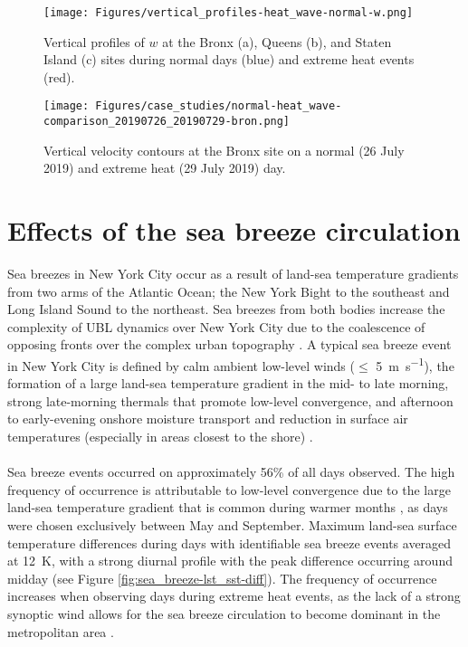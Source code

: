 \begin{figure}[ht]
	\centering
	\texttt{[image: Figures/vertical\_profiles-heat\_wave-normal-w.png]}
	\caption{Vertical profiles of $w$ at the Bronx (a), Queens (b), and Staten Island (c) sites during normal days (blue) and extreme heat events (red).}
	\label{fig:extreme-heat-normal-vertical_profiles-w}
\end{figure}

\begin{figure}[ht]
	\centering
	\texttt{[image: Figures/case\_studies/normal-heat\_wave-comparison\_20190726\_20190729-bron.png]}
	\caption{Vertical velocity contours at the Bronx site on a normal (26 July 2019) and extreme heat (29 July 2019) day.}
	\label{fig:normal-extreme_heat-w-case_study}
\end{figure}

\FloatBarrier

\section{Effects of the sea breeze circulation} \label{section:sea_breeze_effects} 
Sea breezes in New York City occur as a result of land-sea temperature gradients from two arms of the Atlantic Ocean; the New York Bight to the southeast and Long Island Sound to the northeast. Sea breezes from both bodies increase the complexity of UBL dynamics over New York City due to the coalescence of opposing fronts over the complex urban topography \citep{bornstein1981}. A typical sea breeze event in New York City is defined by calm ambient low-level winds ($\leq$ \SI{5}{\meter\per\second}), the formation of a large land-sea temperature gradient in the mid- to late morning, strong late-morning thermals that promote low-level convergence, and afternoon to early-evening onshore moisture transport and reduction in surface air temperatures (especially in areas closest to the shore) \citep{childs2005, frizzola1963, gedzelman2003}. 
\\ \\
Sea breeze events occurred on approximately 56\% of all days observed. The high frequency of occurrence is  attributable to low-level convergence due to the large land-sea temperature gradient that is common during warmer months \citep{childs2005, gedzelman2003, thompson2007}, as days were chosen exclusively between May and September. Maximum land-sea surface temperature differences during days with identifiable sea breeze events averaged at \SI{12}{\kelvin}, with a strong diurnal profile with the peak difference occurring around midday (see Figure \ref{fig:sea_breeze-lst_sst-diff}). The frequency of occurrence increases when observing days during extreme heat events, as the lack of a strong synoptic wind allows for the sea breeze circulation to become dominant in the metropolitan area \citep{miller2003}. 

